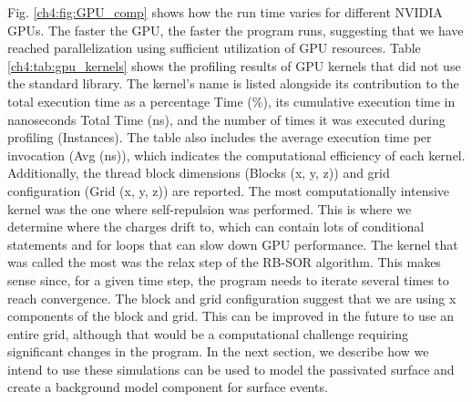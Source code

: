Fig. \ref{ch4:fig:GPU_comp} shows how the run time varies for different NVIDIA GPUs. The faster the GPU, the faster the program runs, suggesting that we have reached parallelization using sufficient utilization of GPU resources. Table \ref{ch4:tab:gpu_kernels} shows the profiling results of GPU kernels that did not use the standard library. The kernel's name is listed alongside its contribution to the total execution time as a percentage Time (\%), its cumulative execution time in nanoseconds Total Time (ns), and the number of times it was executed during profiling (Instances). The table also includes the average execution time per invocation (Avg (ns)), which indicates the computational efficiency of each kernel. Additionally, the thread block dimensions (Blocks (x, y, z)) and grid configuration (Grid (x, y, z)) are reported. The most computationally intensive kernel was the one where self-repulsion was performed. This is where we determine where the charges drift to, which can contain lots of conditional statements and for loops that can slow down GPU performance. The kernel that was called the most was the relax step of the RB-SOR algorithm. This makes sense since, for a given time step, the program needs to iterate several times to reach convergence. The block and grid configuration suggest that we are using x components of the block and grid. This can be improved in the future to use an entire grid, although that would be a computational challenge requiring significant changes in the program. In the next section, we describe how we intend to use these simulations can be used to model the passivated surface and create a background model component for surface events.



